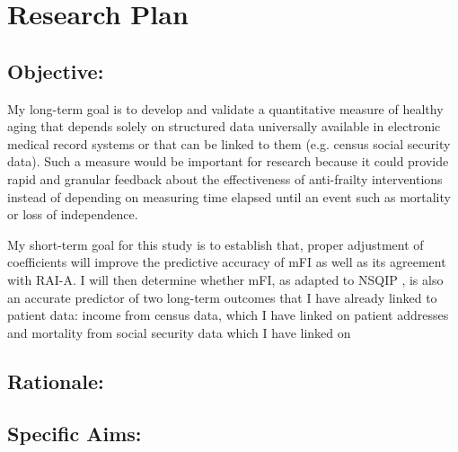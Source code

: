 \section{Research Plan }\label{research-plan}


\subsection{Objective:}\label{objective}
  
My long-term goal is to develop and validate a quantitative measure of healthy aging that depends solely on structured data universally available in electronic medical record systems or that can be linked to them (e.g. census social security data). Such a measure would be important for research because it could provide rapid and granular feedback about the effectiveness of anti-frailty interventions instead of depending on measuring time elapsed until an event such as mortality or loss of independence. 

My short-term goal for this study is to establish that, proper adjustment of coefficients will improve the predictive accuracy of mFI as well as its agreement with RAI-A. I will then determine whether mFI, as adapted to NSQIP \cite{Rockwood_2005}, is also an accurate predictor of two long-term outcomes that I have already linked to patient data: income from census data, which I have linked on patient addresses and mortality from social security data which I have linked on 

\subsection{Rationale:}\label{rationale}

\subsection{Specific Aims:}\label{specific-aims}
